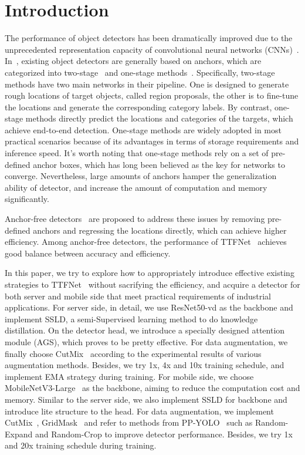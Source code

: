 \documentclass[10pt,twocolumn,letterpaper]{article}
\begin{document}
\section{Introduction}
The performance of object detectors has been dramatically improved due to the unprecedented representation capacity of convolutional neural networks (CNNs)~\cite{li2016survey, krizhevsky2017imagenet}. 
In~\cite{Survey2019}, existing object detectors are generally based on anchors, which are categorized into two-stage~\cite{RCNN14,FastRCNN15,FasterRCNN15,cascade18} and one-stage methods~\cite{iff,YOLO16,Redmon_2019,SSD16}. 
Specifically, two-stage methods have two main networks in their pipeline. One is designed to generate rough locations of target objects, called region proposals, the other is to fine-tune the locations and generate the corresponding category labels. By contrast, one-stage methods directly predict the locations and categories of the targets, which achieve end-to-end detection.
One-stage methods are widely adopted in most practical scenarios because of its advantages in terms of storage requirements and inference speed. 
It's worth noting that one-stage methods rely on a set of pre-defined anchor boxes, which has long been believed as the key for networks to converge. Nevertheless, large amounts of anchors hamper the generalization ability of detector, and increase the amount of computation and memory significantly.  


    Anchor-free detectors~\cite{kong2019foveabox,CenterNet2019,tian2019fcos,ttfnet2020} are proposed to address these issues by removing pre-defined anchors and regressing the locations directly, which can achieve higher efficiency. Among anchor-free detectors, the performance of TTFNet~\cite{ttfnet2020} achieves good balance between accuracy and efficiency. 
    
    In this paper, we try to explore how to appropriately introduce effective existing strategies to TTFNet~\cite{ttfnet2020} without sacrifying the efficiency, and acquire a detector for both server and mobile side that meet practical requirements of industrial applications. 
For server side, in detail, we use ResNet50-vd as the backbone and implement SSLD, a semi-Supervised learning method to do knowledge distillation. On the detector head, we introduce a specially designed attention module (AGS), which proves to be pretty effective. For data augmentation, we finally choose CutMix~\cite{cutmix} according to the experimental results of various augmentation methods. Besides, we try 
   1x, 4x and 10x training schedule, and implement EMA strategy during training.
For mobile side, we choose MobileNetV3-Large~\cite{mobilenetv3} as the backbone, aiming to reduce the computation cost and memory. Similar to the server side, we also implement SSLD for backbone and introduce lite structure to the head. For data augmentation, we implement CutMix~\cite{cutmix}, GridMask~\cite{grid-mask} and refer to methods from PP-YOLO~\cite{long2020pp} such as Random-Expand and Random-Crop to improve detector performance. Besides, we try 1x and 20x training schedule during training.  
	
\end{document}
